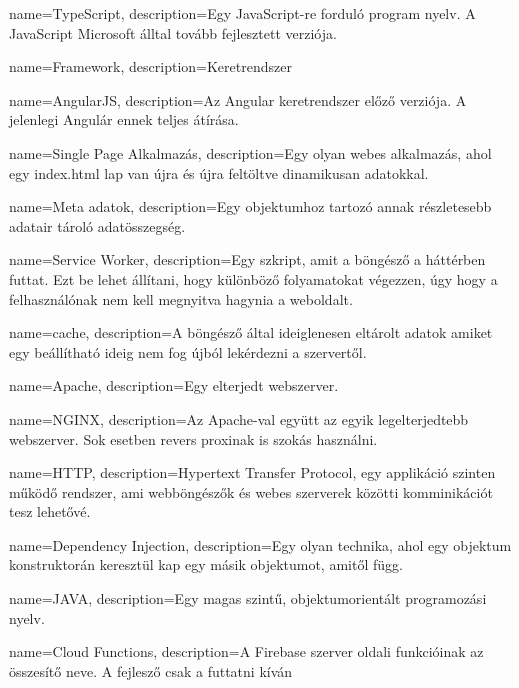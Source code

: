 {
        name=TypeScript,
        description={Egy JavaScript-re forduló program nyelv. A JavaScript Microsoft álltal tovább fejlesztett verziója.}
}

{
        name=Framework,
        description={Keretrendszer}
}

{
        name=AngularJS,
        description={Az Angular keretrendszer előző verziója. A jelenlegi Angulár ennek teljes átírása.}
}

{
        name=Single Page Alkalmazás,
        description={Egy olyan webes alkalmazás, ahol egy index.html lap van újra és újra feltöltve dinamikusan adatokkal.}
}

{
        name=Meta adatok,
        description={Egy objektumhoz tartozó annak  részletesebb adatair tároló adatösszegség.}
}

{
        name=Service Worker,
        description={Egy szkript, amit a böngésző a háttérben futtat. 
        Ezt be lehet állítani, hogy különböző folyamatokat végezzen, úgy hogy a felhasználónak nem kell megnyitva hagynia a weboldalt.}
}

{
        name=cache,
        description={A böngésző által ideiglenesen eltárolt adatok amiket egy beállítható ideig nem fog újból lekérdezni a szervertől.}
}

{
        name=Apache,
        description={Egy elterjedt webszerver.}
}

{
        name=NGINX,
        description={Az \Gls{Apache}-val együtt az egyik legelterjedtebb webszerver. Sok esetben revers proxinak is szokás használni.}
}

{
        name=HTTP,
        description={Hypertext Transfer Protocol, egy applikáció szinten működő rendszer, ami webböngészők és webes szerverek közötti komminikációt tesz lehetővé.}
}

{
        name=Dependency Injection,
        description={Egy olyan technika, ahol egy objektum konstruktorán keresztül kap egy másik objektumot, amitől függ.}
}

{
        name=JAVA,
        description={Egy magas szintű, objektumorientált programozási nyelv.}
}

{
        name=Cloud Functions,
        description={A Firebase szerver oldali funkcióinak az összesítő neve. A fejlesző csak a futtatni kíván}
}
